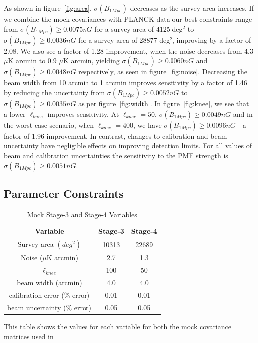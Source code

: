 As shown in figure~\ref{fig:area}, $\sigma(B_{1Mpc})$ decreases as the survey area increases. If we combine the mock covariances with PLANCK data our best constraints range from $\sigma(B_{1Mpc}) \geq 0.0075nG$ for a survey area of 4125 deg$^2$ to $\sigma(B_{1Mpc}) \geq 0.0036nG$ for a survey area of 28877 deg$^2$, improving by a factor of 2.08. We also see a factor of 1.28 improvement, when the noise decreases from 4.3 $\mu$K arcmin to 0.9 $\mu$K arcmin, yielding  $\sigma(B_{1Mpc}) \geq 0.0060nG$ and $\sigma(B_{1Mpc}) \geq 0.0048nG$ respectively, as seen in figure~\ref{fig:noise}. Decreasing the beam width from 10 arcmin to 1 arcmin improves sensitivity by a factor of 1.46 by reducing the uncertainty from $\sigma(B_{1Mpc}) \geq 0.0052nG$ to $\sigma(B_{1Mpc}) \geq 0.0035nG$ as per figure~\ref{fig:width}. In figure~\ref{fig:knee}, we see that a lower $\ell_{knee}$ improves sensitivity. At $\ell_{knee} = 50$, $\sigma(B_{1Mpc}) \geq 0.0049nG$ and in the worst-case scenario, when $\ell_{knee} = 400$, we have $\sigma(B_{1Mpc}) \geq 0.0096nG$ - a factor of 1.96 improvement. In contrast, changes to calibration and beam uncertainty have negligible effects on improving detection limits. For all values of beam and calibration uncertainties the sensitivity to the PMF strength is $\sigma(B_{1Mpc}) \geq 0.0051nG$.

\subsection{Parameter Constraints}

\begin{table}[h]
\centering
\caption{Mock Stage-3 and Stage-4 Variables}

\label{my-label}
\begin{tabular}{l|l|l}
\multicolumn{1}{c}{Variable} & \multicolumn{1}{|c}{Stage-3} & \multicolumn{1}{|c}{Stage-4} \\ \hline
\multicolumn{1}{c}{Survey area $(deg^2)$} & \multicolumn{1}{|c}{10313} & \multicolumn{1}{|c}{22689}  \\
\multicolumn{1}{c}{Noise ($\mu$K arcmin)} & \multicolumn{1}{|c}{2.7} & \multicolumn{1}{|c}{1.3}  \\
\multicolumn{1}{c}{$\ell_{knee}$} & \multicolumn{1}{|c}{100} & \multicolumn{1}{|c}{50} \\
\multicolumn{1}{c}{beam width (arcmin)} & \multicolumn{1}{|c}{4.0} & \multicolumn{1}{|c}{4.0}   \\
\multicolumn{1}{c}{calibration error (\% error)} & \multicolumn{1}{|c}{0.01} & \multicolumn{1}{|c}{0.01} \\
\multicolumn{1}{c}{beam uncertainty (\% error)} & \multicolumn{1}{|c}{0.05} & \multicolumn{1}{|c}{0.05}
\end{tabular}

\bigskip
\begin{flushleft}
This table shows the values for each variable for both the mock covariance matrices used in 
\end{flushleft}
\end{table}

